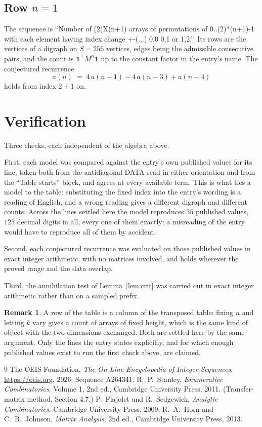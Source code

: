 \documentclass[11pt,a4paper]{article}
\theoremstyle{plain}
\theoremstyle{definition}
\newtheorem{remark}[theorem]{Remark}
\begin{document}
\subsection*{Row $n$$=1$}
The sequence is ``Number of (2)X(n+1) arrays of permutations of 0..(2)*(n+1)-1 with each element having index change +-(.,.) 0,0 0,1 or 1,2.''. Its rows are the vertices of a digraph on
$S=256$ vertices, edges being the admissible consecutive pairs, and the count is
$\mathbf{1}^{\!\top}M^{n}\mathbf{1}$ up to the constant factor in the entry's name.
The conjectured recurrence
\[
a(n)\;=\;4\,a(n-1) - 4\,a(n-3) + a(n-4)
\]
holds from index $2+1$ on.

\section{Verification}

Three checks, each independent of the algebra above.

First, each model was compared against the entry's own published values for its line, taken
both from the antidiagonal DATA read in either orientation and from the ``Table starts''
block, and agrees at every available term. This is what ties a model to the table:
substituting the fixed index into the entry's wording is a reading of English, and a wrong
reading gives a different digraph and different counts. Across the lines settled here the
model reproduces $35$ published values, $125$ decimal digits in all, every one of
them exactly; a misreading of the entry would have to reproduce all of them by accident.

Second, each conjectured recurrence was evaluated on those published values in exact
integer arithmetic, with no matrices involved, and holds wherever the proved range and the
data overlap.

Third, the annihilation test of Lemma~\ref{lem:crit} was carried out in exact integer
arithmetic rather than on a sampled prefix.

\begin{remark}
A row of the table is a column of the transposed table: fixing $n$ and letting $k$ vary gives a
count of arrays of fixed height, which is the same kind of object with the two dimensions
exchanged. Both are settled here by the same argument. Only the lines the entry states
explicitly, and for which enough published values exist to run the first check above, are
claimed.
\end{remark}

\begin{thebibliography}{9}
 The OEIS Foundation, \emph{The On-Line Encyclopedia of Integer
Sequences}, \url{https://oeis.org}, 2026. Sequence A264341.
 R.~P.~Stanley, \emph{Enumerative Combinatorics}, Volume 1, 2nd ed.,
Cambridge University Press, 2011. (Transfer-matrix method, Section 4.7.)
 P.~Flajolet and R.~Sedgewick, \emph{Analytic Combinatorics}, Cambridge
University Press, 2009.
 R.~A.~Horn and C.~R.~Johnson, \emph{Matrix Analysis}, 2nd ed., Cambridge
University Press, 2013.
\end{thebibliography}
\end{document}
